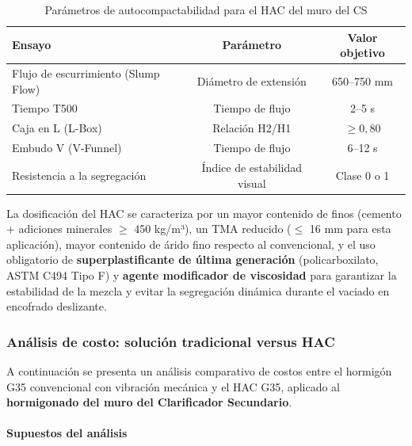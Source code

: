 \begin{table}[H]
  \centering
  \caption{Parámetros de autocompactabilidad para el HAC del muro del CS}
  \label{tab:hac}
  \begin{tabular}{lcc}
    \toprule
    \textbf{Ensayo}                     & \textbf{Parámetro}         & \textbf{Valor objetivo} \\
    \midrule
    Flujo de escurrimiento (Slump Flow) & Diámetro de extensión      & 650--750 mm             \\
    Tiempo T500                         & Tiempo de flujo            & 2--5 s                  \\
    Caja en L (L-Box)                   & Relación H2/H1             & $\geq 0{,}80$           \\
    Embudo V (V-Funnel)                 & Tiempo de flujo            & 6--12 s                 \\
    Resistencia a la segregación        & Índice de estabilidad visual & Clase 0 o 1            \\
    \bottomrule
  \end{tabular}
\end{table}

\noindent La dosificación del HAC se caracteriza por un mayor contenido de finos (cemento + adiciones minerales $\geq$ 450 kg/m³), un TMA reducido ($\leq$ 16 mm para esta aplicación), mayor contenido de árido fino respecto al convencional, y el uso obligatorio de \textbf{superplastificante de última generación} (policarboxilato, ASTM C494 Tipo F) y \textbf{agente modificador de viscosidad} para garantizar la estabilidad de la mezcla y evitar la segregación dinámica durante el vaciado en encofrado deslizante.

\subsubsection{Análisis de costo: solución tradicional versus HAC}

A continuación se presenta un análisis comparativo de costos entre el hormigón G35 convencional con vibración mecánica y el HAC G35, aplicado al \textbf{hormigonado del muro del Clarificador Secundario}.

\paragraph{Supuestos del análisis}

